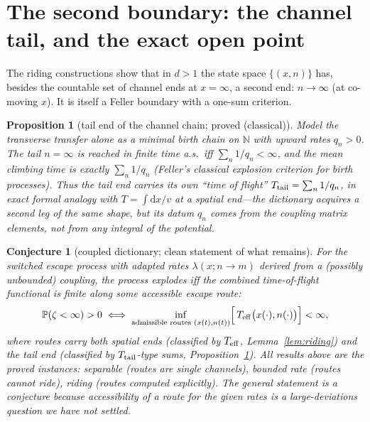 \documentclass[11pt]{article}
\newtheorem{proposition}[theorem]{Proposition}
\newtheorem{conjecture}[theorem]{Conjecture}
\theoremstyle{remark}
\newcommand{\dd}{\mathrm{d}}
\newcommand{\Prob}{\mathbb{P}}
\newcommand{\N}{\mathbb{N}}
\begin{document}
\section{The second boundary: the channel tail, and the exact open
point}
\label{sec:tail}

The riding constructions show that in $d>1$ the state space
$\{(x,n)\}$ has, besides the countable set of channel ends at
$x=\infty$, a second end: $n\to\infty$ (at co-moving $x$).  It is
itself a Feller boundary with a one-sum criterion.

\begin{proposition}[tail end of the channel chain; proved
(classical)]\label{prop:tail}
Model the transverse transfer alone as a minimal birth chain on $\N$
with upward rates $q_{n}>0$.  The tail $n=\infty$ is reached in finite
time a.s.\ iff $\sum_{n}1/q_{n}<\infty$, and the mean climbing time is
exactly $\sum_{n}1/q_{n}$ (Feller's classical explosion criterion for
birth processes).  Thus the tail end carries its own ``time of
flight'' $T_{\rm tail}=\sum_{n}1/q_{n}$, in exact formal analogy with
$T=\int\dd x/v$ at a spatial end---\emph{the dictionary acquires a
second leg of the same shape}, but its datum $q_{n}$ comes from the
coupling matrix elements, not from any integral of the potential.
\end{proposition}

\begin{conjecture}[coupled dictionary; clean statement of what remains]
\label{conj:coupled}
For the switched escape process with adapted rates
$\lambda(x;n\to m)$ derived from a (possibly unbounded) coupling, the
process explodes iff the combined time-of-flight functional is finite
along some accessible escape route:
\[
\Prob(\zeta<\infty)>0
\iff
\inf_{\text{admissible routes }(x(t),n(t))}
\Bigl[\,T_{\rm eff}\bigl(x(\cdot),n(\cdot)\bigr)\Bigr]<\infty ,
\]
where routes carry both spatial ends (classified by $T_{\rm eff}$,
Lemma~\ref{lem:riding}) and the tail end (classified by
$T_{\rm tail}$-type sums, Proposition~\ref{prop:tail}).  All results
above are the proved instances: separable (routes are single channels),
bounded rate (routes cannot ride), riding (routes computed
explicitly).  The general statement is a conjecture because
accessibility of a route for the \emph{given} rates is a
large-deviations question we have not settled.
\end{conjecture}
\end{document}
